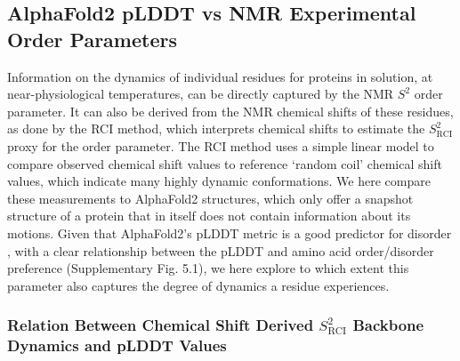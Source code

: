 \subsection{AlphaFold2 pLDDT vs NMR Experimental Order Parameters}

Information on the dynamics of individual residues for proteins in solution, at near-physiological temperatures, can be directly captured by the NMR $S^{2}$ order parameter. It can also be derived from the NMR chemical shifts of these residues, as done by the RCI method, which interprets chemical shifts to estimate the $S^{2}_{\text{RCI}}$ proxy for the order parameter. The RCI method uses a simple linear model to compare observed chemical shift values to reference `random coil' chemical shift values, which indicate many highly dynamic conformations. We here compare these measurements to AlphaFold2 structures, which only offer a snapshot structure of a protein that in itself does not contain information about its motions. Given that AlphaFold2's pLDDT metric is a good predictor for disorder \cite{piovesan_intrinsic_2022}, with a clear relationship between the pLDDT and amino acid order/disorder preference (Supplementary Fig. 5.1),
we here explore to which extent this parameter also captures the degree of dynamics a residue experiences.

\subsubsection{Relation Between Chemical Shift Derived $S^{2}_{\text{RCI}}$ Backbone Dynamics and pLDDT Values}

